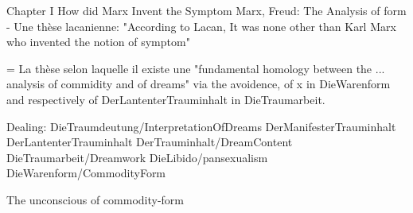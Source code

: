 
Chapter I How did Marx Invent the Symptom
Marx, Freud: The Analysis of form
- Une thèse lacanienne: "According to Lacan, It was none other than Karl Marx who invented the notion of symptom"

= La thèse selon laquelle il existe une "fundamental homology between the ... analysis of commidity and of dreams" via the avoidence, of x in DieWarenform and respectively of DerLantenterTrauminhalt in DieTraumarbeit.



Dealing: DieTraumdeutung/InterpretationOfDreams DerManifesterTrauminhalt DerLantenterTrauminhalt DerTrauminhalt/DreamContent DieTraumarbeit/Dreamwork DieLibido/pansexualism DieWarenform/CommodityForm


The unconscious of commodity-form
